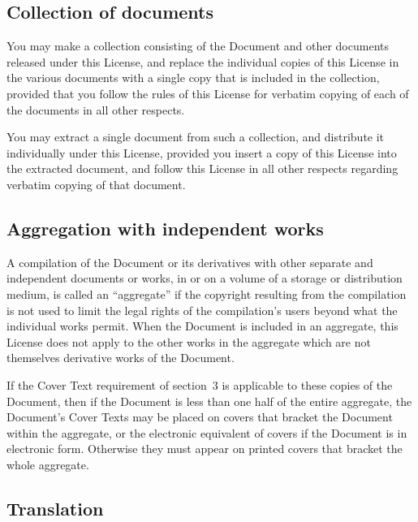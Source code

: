 \documentclass[letterpaper,twoside]{scrartcl}
\begin{document}
   
   
   \subsection{Collection of documents}
   

   You may make a collection consisting of the Document and other documents
   released under this License, and replace the individual copies of this
   License in the various documents with a single copy that is included in
   the collection, provided that you follow the rules of this License for
   verbatim copying of each of the documents in all other respects.

   You may extract a single document from such a collection, and distribute
   it individually under this License, provided you insert a copy of this
   License into the extracted document, and follow this License in all
   other respects regarding verbatim copying of that document.


   
   
   \subsection{Aggregation with independent works}
   


   A compilation of the Document or its derivatives with other separate
   and independent documents or works, in or on a volume of a storage or
   distribution medium, is called an ``aggregate'' if the copyright
   resulting from the compilation is not used to limit the legal rights
   of the compilation's users beyond what the individual works permit.
   When the Document is included in an aggregate, this License does not
   apply to the other works in the aggregate which are not themselves
   derivative works of the Document.

   If the Cover Text requirement of section~3 is applicable to these
   copies of the Document, then if the Document is less than one half of
   the entire aggregate, the Document's Cover Texts may be placed on
   covers that bracket the Document within the aggregate, or the
   electronic equivalent of covers if the Document is in electronic form.
   Otherwise they must appear on printed covers that bracket the whole
   aggregate.


   
   
   \subsection{Translation}
   
\end{document}
